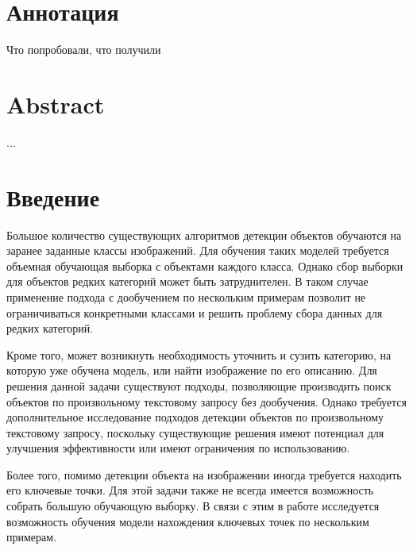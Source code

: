 \documentclass[a4paper,14pt]{article}
\begin{document}
    

    \section*{\normalsize \hfill Аннотация \hfill}

    Что попробовали, что получили

    \sloppy
    \newpage

    \section*{\normalsize \hfill Abstract \hfill}

    ...

    \newpage

    \tableofcontents
    \pagebreak

    \section*{Введение}

	Большое количество существующих алгоритмов детекции объектов обучаются на заранее заданные классы изображений. 
	Для обучения таких моделей требуется объемная обучающая выборка с объектами каждого класса. 
	Однако сбор выборки для объектов редких категорий может быть затруднителен.
	В таком случае применение подхода с дообучением по нескольким примерам позволит не ограничиваться конкретными классами и решить проблему сбора данных для редких категорий.
	
	Кроме того, может возникнуть необходимость уточнить и сузить категорию, на которую уже обучена модель, или найти изображение по его описанию.
	Для решения данной задачи существуют подходы, позволяющие производить поиск объектов по произвольному текстовому запросу без дообучения.
	Однако требуется дополнительное исследование подходов детекции объектов по произвольному текстовому запросу, поскольку существующие решения имеют потенциал для улучшения эффективности или имеют ограничения по использованию.
	
	Более того, помимо детекции объекта на изображении иногда требуется находить его ключевые точки.
	Для этой задачи также не всегда имеется возможность собрать большую обучающую выборку.
	В связи с этим в работе исследуется возможность обучения модели нахождения ключевых точек по нескольким примерам.

    \newpage
\end{document}

